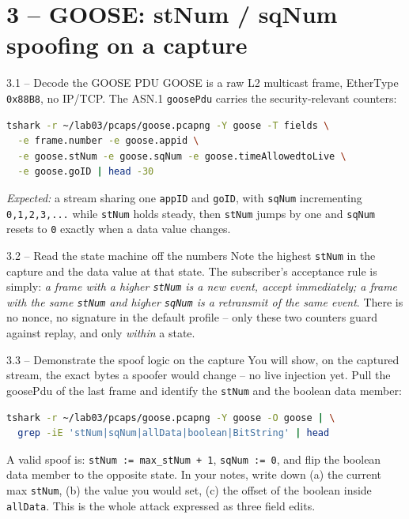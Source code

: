 \documentclass[11pt,a4paper]{article}
\begin{document}
\section*{3 -- GOOSE: stNum / sqNum spoofing on a capture}

\begin{stepbox}{3.1 -- Decode the GOOSE PDU}
GOOSE is a raw L2 multicast frame, EtherType \texttt{0x88B8}, no IP/TCP.
The ASN.1 \texttt{goosePdu} carries the security-relevant counters:
\begin{lstlisting}[language=bash]
tshark -r ~/lab03/pcaps/goose.pcapng -Y goose -T fields \
  -e frame.number -e goose.appid \
  -e goose.stNum -e goose.sqNum -e goose.timeAllowedtoLive \
  -e goose.goID | head -30
\end{lstlisting}
\emph{Expected:} a stream sharing one \texttt{appID} and \texttt{goID},
with \texttt{sqNum} incrementing \texttt{0,1,2,3,...} while \texttt{stNum}
holds steady, then \texttt{stNum} jumps by one and \texttt{sqNum} resets to
\texttt{0} exactly when a data value changes.
\end{stepbox}

\begin{stepbox}{3.2 -- Read the state machine off the numbers}
Note the highest \texttt{stNum} in the capture and the data value at that
state. The subscriber's acceptance rule is simply: \emph{a frame with a
higher \texttt{stNum} is a new event, accept immediately; a frame with the
same \texttt{stNum} and higher \texttt{sqNum} is a retransmit of the same
event}. There is no nonce, no signature in the default profile -- only
these two counters guard against replay, and only \emph{within} a state.
\end{stepbox}

\begin{stepbox}{3.3 -- Demonstrate the spoof logic on the capture}
You will show, on the captured stream, the exact bytes a spoofer would
change -- no live injection yet. Pull the goosePdu of the last frame and
identify the \texttt{stNum} and the boolean data member:
\begin{lstlisting}[language=bash]
tshark -r ~/lab03/pcaps/goose.pcapng -Y goose -O goose | \
  grep -iE 'stNum|sqNum|allData|boolean|BitString' | head
\end{lstlisting}
A valid spoof is: \texttt{stNum := max\_stNum + 1},
\texttt{sqNum := 0}, and flip the boolean data member to the opposite
state. In your notes, write down (a) the current max \texttt{stNum},
(b) the value you would set, (c) the offset of the boolean inside
\texttt{allData}. This is the whole attack expressed as three field edits.
\end{stepbox}
\end{document}
